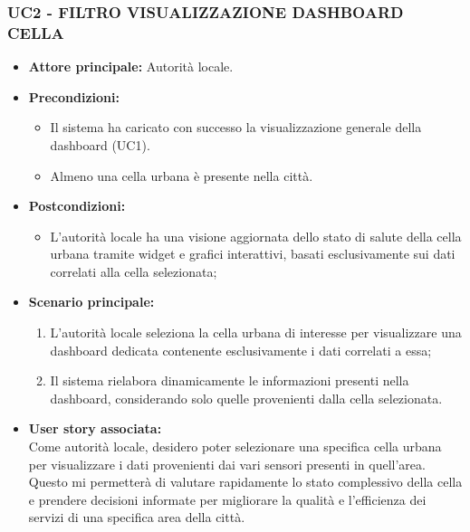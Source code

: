 \subsubsection{UC2 - FILTRO VISUALIZZAZIONE DASHBOARD CELLA}
\begin{itemize}
    \item \textbf{Attore principale:} Autorità locale.
    \item \textbf{Precondizioni:}
        \begin{itemize}
            \item Il sistema ha caricato con successo la visualizzazione generale della dashboard (UC1). 
            \item Almeno una cella urbana è presente nella città. 
        \end{itemize}
    \item \textbf{Postcondizioni:}
        \begin{itemize}
            \item L’autorità locale ha una visione aggiornata dello stato di salute della cella urbana tramite widget e grafici interattivi, basati esclusivamente sui dati correlati alla cella selezionata; 
        \end{itemize}
    \item \textbf{Scenario principale:}
        \begin{enumerate}
            \item L’autorità locale seleziona la cella urbana di interesse per visualizzare una dashboard dedicata contenente esclusivamente i dati correlati a essa;
            \item Il sistema rielabora dinamicamente le informazioni presenti nella dashboard, considerando solo quelle provenienti dalla cella selezionata.
        \end{enumerate}
    \item \textbf{User story associata:} \\ 
        Come autorità locale, desidero poter selezionare una specifica cella urbana per visualizzare i dati provenienti dai vari sensori presenti in quell’area. Questo mi permetterà di valutare rapidamente lo stato complessivo della cella e prendere decisioni informate per migliorare la qualità e l'efficienza dei servizi di una specifica area della città.
\end{itemize}

